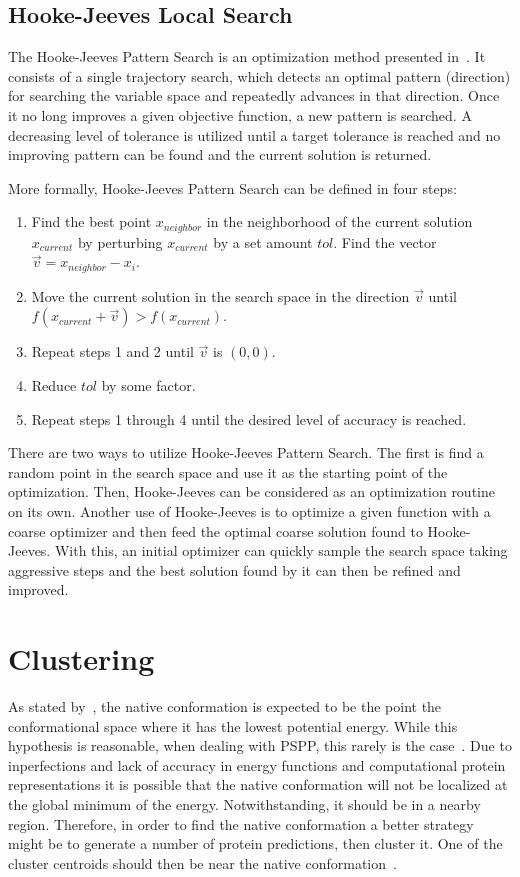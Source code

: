 \subsection{Hooke-Jeeves Local Search}

The Hooke-Jeeves Pattern Search is an optimization method presented
in~\cite{hooke1961direct}. It consists of a single trajectory search, which
detects an optimal pattern (direction) for searching the variable space and
repeatedly advances in that direction. Once it no long improves a given
objective function, a new pattern is searched. A decreasing level of tolerance
is utilized until a target tolerance is reached and no improving pattern can be
found and the current solution is returned.

More formally, Hooke-Jeeves Pattern Search can be defined in four steps:
\begin{enumerate}
    \item Find the best point $x_{neighbor}$ in the neighborhood of the current
    solution $x_{current}$ by perturbing $x_{current}$ by a set amount $tol$.
    Find the vector $\vec{v} = x_{neighbor} - x_i$.
    \item Move the current solution in the search space in the direction $\vec{v}$
    until $f(x_{current} + \vec{v}) > f(x_{current})$.
    \item Repeat steps 1 and 2 until $\vec{v}$ is $(0, 0)$.
    \item Reduce $tol$ by some factor.
    \item Repeat steps 1 through 4 until the desired level of accuracy is reached.
\end{enumerate}

There are two ways to utilize Hooke-Jeeves Pattern Search. The first is find a
random point in the search space and use it as the starting point of the optimization.
Then, Hooke-Jeeves can be considered as an optimization routine on its own. Another
use of Hooke-Jeeves is to optimize a given function with a coarse optimizer and then
feed the optimal coarse solution found to Hooke-Jeeves. With this, an initial
optimizer can quickly sample the search space taking aggressive steps and the best
solution found by it can then be refined and improved.

\section{Clustering}
\label{sec:clustering}

As stated by~, the native conformation is
expected to be the point the conformational space where it has the lowest
potential energy. While this hypothesis is reasonable, when dealing with
\ac{PSPP}, this rarely is the case~\cite{shortle1998clustering}. Due to
inperfections and lack of accuracy in energy functions and computational
protein representations it is possible that the native conformation will not be
localized at the global minimum of the energy. Notwithstanding, it should be
in a nearby region. Therefore, in order to find the native conformation a better
strategy might be to generate a number of protein predictions, then cluster it.
One of the cluster centroids should then be near the native
conformation~\cite{zhang2004spicker}.

